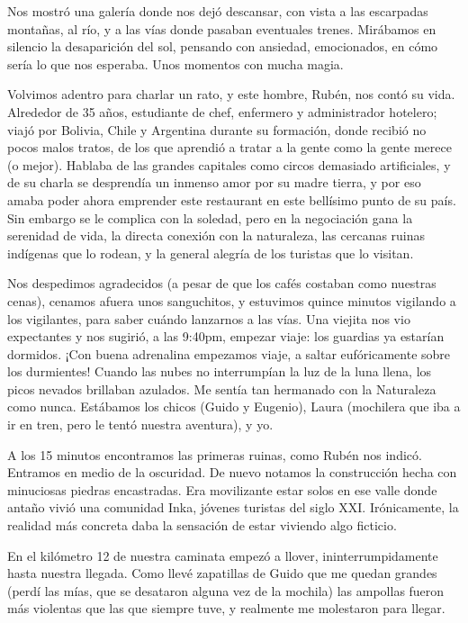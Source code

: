 Nos mostró una galería donde nos dejó descansar, con vista a las escarpadas
montañas, al río, y a las vías donde pasaban eventuales trenes. Mirábamos
en silencio la desaparición del sol, pensando con ansiedad, emocionados, en
cómo sería lo que nos esperaba. Unos momentos con mucha magia.

Volvimos adentro para charlar un rato, y este hombre, Rubén, nos contó su
vida. Alrededor de 35 años, estudiante de chef, enfermero y administrador
hotelero; viajó por Bolivia, Chile y Argentina durante su formación, donde
recibió no pocos malos tratos, de los que aprendió a tratar a la gente como la
gente merece (o mejor). Hablaba de las grandes capitales como circos demasiado
artificiales, y de su charla se desprendía un inmenso amor por su madre tierra,
y por eso amaba poder ahora emprender este restaurant en este bellísimo punto
de su país. Sin embargo se le complica con la soledad, pero en la negociación
gana la serenidad de vida, la directa conexión con la naturaleza, las cercanas
ruinas indígenas que lo rodean, y la general alegría de los turistas que lo
visitan.

Nos despedimos agradecidos (a pesar de que los cafés costaban como nuestras
cenas), cenamos afuera unos sanguchitos, y estuvimos quince minutos vigilando a
los vigilantes, para saber cuándo lanzarnos a las vías. Una viejita nos vio
expectantes y nos sugirió, a las 9:40pm, empezar viaje: los guardias ya
estarían dormidos. ¡Con buena adrenalina empezamos viaje, a
saltar eufóricamente sobre los durmientes! Cuando las nubes no interrumpían la
luz de la luna llena, los picos nevados brillaban azulados. Me sentía tan
hermanado con la Naturaleza como nunca. Estábamos los chicos (Guido y Eugenio),
Laura (mochilera que iba a ir en tren, pero le tentó nuestra aventura), y yo.

A los 15 minutos encontramos las primeras ruinas, como Rubén nos indicó.
Entramos en medio de la oscuridad. De nuevo notamos la construcción hecha con
minuciosas piedras encastradas. Era movilizante estar solos en ese valle donde
antaño vivió una comunidad Inka, jóvenes turistas del siglo {\small
XXI}. Irónicamente, la realidad más concreta daba la sensación de estar
viviendo algo ficticio.

En el kilómetro 12 de nuestra caminata empezó a llover, ininterrumpidamente
hasta nuestra llegada. Como llevé zapatillas de Guido que me quedan grandes
(perdí las mías, que se desataron alguna vez de la mochila) las ampollas
fueron más violentas que las que siempre tuve, y realmente me molestaron para
llegar.

